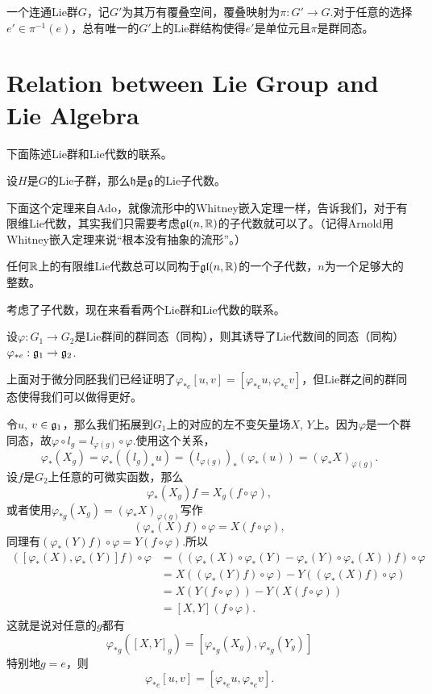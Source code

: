 \para 一个连通Lie群$G$，记$G'$为其万有覆叠空间，覆叠映射为$\pi:G'\to G$.对于任意的选择$e'\in \pi^{-1}(e)$，总有唯一的$G'$上的Lie群结构使得$e'$是单位元且$\pi$是群同态。

\section{Relation between Lie Group and Lie Algebra}

下面陈述Lie群和Lie代数的联系。

\para 设$H$是$G$的Lie子群，那么$\mathfrak{h}$是${\mathfrak{g}}$的Lie子代数。

下面这个定理来自Ado，就像流形中的Whitney嵌入定理一样，告诉我们，对于有限维Lie代数，其实我们只需要考虑$\mathfrak{gl}(n,\mathbb{R})$的子代数就可以了。（记得Arnold用Whitney嵌入定理来说“根本没有抽象的流形”。）

\theo 任何$\mathbb{R}$上的有限维Lie代数总可以同构于$\mathfrak{gl}(n,\mathbb{R})$的一个子代数，$n$为一个足够大的整数。

考虑了子代数，现在来看看两个Lie群和Lie代数的联系。

\para 设$\varphi:G_1\to G_2$是Lie群间的群同态（同构），则其诱导了Lie代数间的同态（同构）$\varphi_{*e}:{\mathfrak{g}}_1\to {\mathfrak{g}}_2$.

上面对于微分同胚我们已经证明了$\varphi_{*e}[u,v]=[\varphi_{*e}u,\varphi_{*e}v]$，但Lie群之间的群同态使得我们可以做得更好。

令$u$, $v\in{\mathfrak{g}}_1$，那么我们拓展到$G_1$上的对应的左不变矢量场$X$, $Y$上。因为$\varphi$是一个群同态，故$\varphi\circ l_g=l_{\varphi(g)}\circ \varphi$.使用这个关系，
\[
	\varphi_{*}(X_g)=\varphi_{*}((l_g)_*u)=(l_{\varphi(g)})_*(\varphi_{*}(u))=(\varphi_{*}X)_{\varphi(g)}.
\]
设$f$是$G_2$上任意的可微实函数，那么
\[
\varphi_{*}(X_g)f=X_g(f\circ \varphi),
\]
或者使用$\varphi_{*g}(X_g)=(\varphi_{*}X)_{\varphi(g)}$写作
\[
(\varphi_{*}(X)f)\circ \varphi=X(f\circ \varphi),
\]
同理有$(\varphi_{*}(Y)f)\circ \varphi=Y(f\circ \varphi)$.所以
\[
	\begin{split}
		([\varphi_*(X),\varphi_*(Y)]f)\circ \varphi&=((\varphi_*(X)\circ\varphi_*(Y)-\varphi_*(Y)\circ\varphi_*(X))f)\circ \varphi\\
		&=X((\varphi_*(Y)f)\circ \varphi)-Y((\varphi_*(X)f)\circ \varphi)\\
		&=X(Y(f\circ \varphi))-Y(X(f\circ \varphi))\\
		&=[X,Y](f\circ \varphi).
	\end{split}
\]
这就是说对任意的$g$都有
\[
	\varphi_{*g}([X,Y]_g)=[\varphi_{*g}(X_g),\varphi_{*g}(Y_g)]
\]
特别地$g=e$，则
\[
	\varphi_{*e}[u,v]=[\varphi_{*e}u,\varphi_{*e}v].
\]


